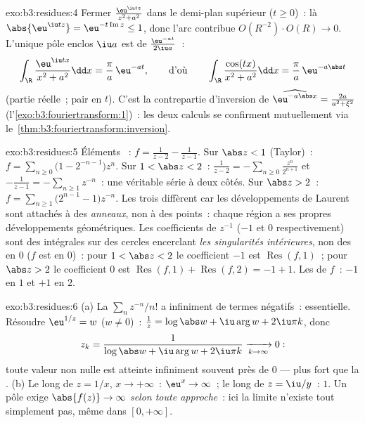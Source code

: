 \begin{solution}{exo:b3:residues:4}
Fermer $\frac{\eu^{\iu tz}}{z^2 + a^2}$ dans le demi-plan
supérieur ($t \geq 0$)~: là $\abs{\eu^{\iu tz}} =
\eu^{-t\operatorname{Im}z} \leq 1$, donc l'arc contribue
$O(R^{-2})\cdot O(R) \to 0$. L'unique pôle enclos $\iu a$
est  de  $\frac{\eu^{-at}}{2\iu a}$~:
\[
\int_\R\frac{\eu^{\iu tx}}{x^2 + a^2}\dd x =
\frac{\pi}{a}\,\eu^{-at},
\qquad\text{d'où}\qquad
\int_\R\frac{\cos(tx)}{x^2+a^2}\dd x = \frac\pi
a\,\eu^{-a\abs t}
\]
(partie réelle~; pair en $t$). C'est la contrepartie
d'inversion de $\widehat{\eu^{-a\abs x}} =
\frac{2a}{a^2+\xi^2}$ (l'\cref{exo:b3:fouriertransform:1})~:
les deux calculs se confirment mutuellement via
le~\cref{thm:b3:fouriertransform:inversion}.
\end{solution}

\begin{solution}{exo:b3:residues:5}
Éléments ~: $f = \frac1{z-2} - \frac1{z-1}$.
Sur $\abs z < 1$ (Taylor)~: $f =
\sum_{n\geq0}\bigl(1 - 2^{-n-1}\bigr)z^n$.
Sur $1 < \abs z < 2$~: $\frac1{z-2} =
-\sum_{n\geq0}\frac{z^n}{2^{n+1}}$ et $-\frac1{z-1} =
-\sum_{n\geq1}z^{-n}$~: une véritable série à deux côtés.
Sur $\abs z > 2$~: $f = \sum_{n\geq1}\bigl(2^{n-1} -
1\bigr)z^{-n}$. Les trois diffèrent car les développements
de Laurent sont attachés à des \emph{anneaux}, non à des
points~: chaque région a ses propres développements
géométriques. Les coefficients de $z^{-1}$ ($-1$ et $0$
respectivement) sont des intégrales sur des cercles
encerclant \emph{les singularités intérieures}, non des
 en $0$ ($f$ est  en $0$)~: pour $1 < \abs
z < 2$ le coefficient $-1$ est $\operatorname{Res}(f, 1)$~;
pour $\abs z > 2$ le coefficient $0$ est
$\operatorname{Res}(f,1) + \operatorname{Res}(f,2) = -1 +
1$. Les  de $f$~: $-1$ en $1$ et $+1$ en $2$.
\end{solution}

\begin{solution}{exo:b3:residues:6}
(a) La  $\sum_nz^{-n}/n!$ a infiniment de
termes négatifs~: essentielle. Résoudre $\eu^{1/z} = w$
($w \neq 0$)~: $\frac1z = \log\abs w + \iu\arg w +
2\iu\pi k$, donc
\[
z_k = \frac1{\log\abs w + \iu\arg w + 2\iu\pi k}
\xrightarrow[k\to\infty]{} 0 :
\]
toute valeur non nulle est atteinte infiniment souvent près
de $0$ --- plus fort que la .
(b) Le long de $z = 1/x$, $x \to +\infty$~: $\eu^x \to
\infty$~; le long de $z = \iu/y$~:  $1$. Un pôle
exige $\abs{f(z)} \to \infty$ \emph{selon toute approche}~:
ici la limite n'existe tout simplement pas, même dans
$[0, +\infty]$.
\end{solution}

